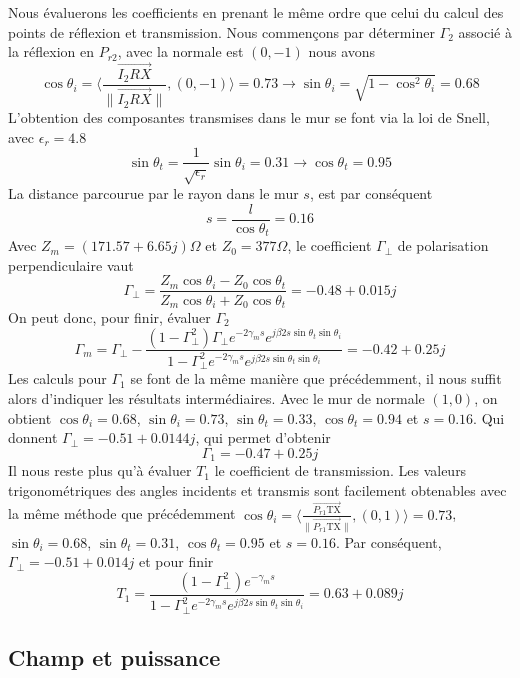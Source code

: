 Nous {\'e}valuerons les coefficients en prenant le m{\^e}me ordre que celui du
calcul des points de r{\'e}flexion et transmission. Nous commençons par d{\'e}terminer
$\Gamma_2$ associ{\'e} {\`a} la r{\'e}flexion en $P_{r 2}$, avec la normale est
$(0, - 1)$ nous avons 
\[ \cos \theta_i = \langle \frac{\overrightarrow{I_2 R X}}{\|
   \overrightarrow{I_2 R X} \|}, (0, - 1) \rangle = 0.73 \rightarrow \sin
   \theta_i = \sqrt{1 - \cos^2 \theta_i} = 0.68 \]
L'obtention des composantes transmises dans le mur se font via la loi de
Snell, avec $\epsilon_r = 4.8$
\[ \sin \theta_t = \frac{1}{\sqrt{\epsilon_r}} \sin \theta_i = 0.31
   \rightarrow \cos \theta_t = 0.95 \]
La distance parcourue par le rayon dans le mur $s$, est par cons{\'e}quent
\[ s = \frac{l}{\cos \theta_t} = 0.16 \]
Avec $Z_m = (171.57 + 6.65 j){\Omega}$ et $Z_0 = 377 \Omega$, le coefficient
$\Gamma_{\perp}$ de polarisation perpendiculaire vaut
\[ \Gamma_{\perp} = \frac{Z_m \cos \theta_i - Z_0 \cos \theta_t}{Z_m \cos
   \theta_i + Z_0 \cos \theta_t} = - 0.48 + 0.015 j \]
On peut donc, pour finir, {\'e}valuer $\Gamma_2$
\[ \Gamma_m = \Gamma_{\perp} - \frac{(1 - \Gamma_{\perp}^2) \Gamma_{\perp}
   e^{- 2 \gamma_m s} e^{j \beta 2 s \sin \theta_t \sin \theta_i}}{1 -
   \Gamma_{\perp}^2 e^{- 2 \gamma_m s} e^{j \beta 2 s \sin \theta_t \sin
   \theta_i}} = - 0.42 + 0.25 j \]
Les calculs pour $\Gamma_1$ se font de la m{\^e}me mani{\`e}re que
pr{\'e}c{\'e}demment, il nous suffit alors d'indiquer les r{\'e}sultats
interm{\'e}diaires.
Avec le mur de normale $(1, 0)$, on obtient $\cos \theta_i = 0.68$, $\sin
\theta_i = 0.73$, $\sin \theta_t = 0.33$, $\cos \theta_t = 0.94$ et $s = 0.16$.
Qui donnent $\Gamma_{\perp} = - 0.51 + 0.0144 j$, qui permet d'obtenir
\[ \Gamma_1 = - 0.47 + 0.25 j \]
Il nous reste plus qu'{\`a} {\'e}valuer $T_1$ le coefficient de transmission.
Les valeurs trigonom{\'e}triques des angles incidents et transmis sont
facilement obtenables avec la m{\^e}me m{\'e}thode que pr{\'e}c{\'e}demment
$\cos \theta_i = \langle \frac{\overrightarrow{P_{r 1} \mathrm{TX}}}{\|
\overrightarrow{P_{r 1} \mathrm{TX}} \|}, (0, 1) \rangle = 0.73$, $\sin \theta_i
= 0.68$, $\sin \theta_t = 0.31$, $\cos \theta_t = 0.95$ et $s = 0.16$.
Par cons{\'e}quent, $\Gamma_{\perp} = - 0.51 + 0.014 j$ et pour finir
\[ T_1 = \frac{(1 - \Gamma_{\perp}^2) e^{- \gamma_m s}}{1 - \Gamma_{\perp}^2
   e^{- 2 \gamma_m s} e^{j \beta 2 s \sin \theta_t \sin \theta_i}} = 0.63 +
   0.089 j \]

\subsection{Champ et puissance}

